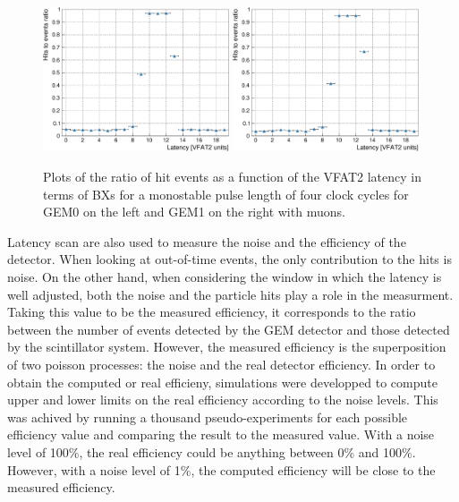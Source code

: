       \begin{figure}[h!]
        \centering
        \includegraphics[width=0.49\textwidth]{img/plots/cLatency_GEM0-crop}
        \includegraphics[width=0.49\textwidth]{img/plots/cLatency_GEM1-crop}
        \caption{Plots of the ratio of hit events as a function of the VFAT2 latency in terms of BXs for a monostable pulse length of four clock cycles for GEM0 on the left and GEM1 on the right with muons.}
        \label{fig:II-3-data-latency}
      \end{figure}

      Latency scan are also used to measure the noise and the efficiency of the detector. When looking at out-of-time events, the only contribution to the hits is noise. On the other hand, when considering the window in which the latency is well adjusted, both the noise and the particle hits play a role in the measurment. Taking this value to be the measured efficiency, it corresponds to the ratio between the number of events detected by the GEM detector and those detected by the scintillator system. However, the measured efficiency is the superposition of two poisson processes: the noise and the real detector efficiency. In order to obtain the computed or real efficieny, simulations were developped to compute upper and lower limits on the real efficiency according to the noise levels. This was achived by running a thousand pseudo-experiments for each possible efficiency value and comparing the result to the measured value. With a noise level of 100\%, the real efficiency could be anything between 0\% and 100\%. However, with a noise level of 1\%, the computed efficiency will be close to the measured efficiency.

